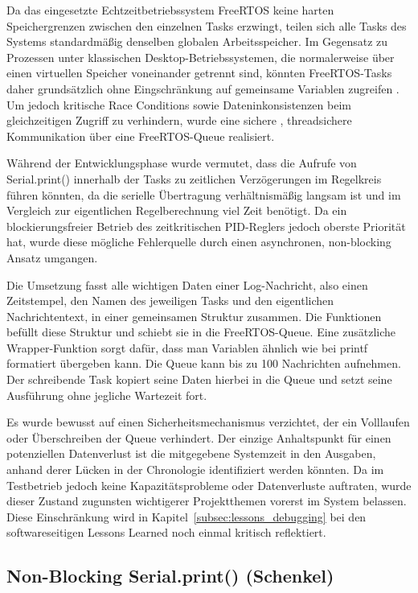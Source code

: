 \documentclass[fontsize=12pt,
parskip=half,	%
department=FakM,  %
logostyle=flat,
twoside, %
DIV=15,BCOR=10mm, %
]{OTHRreprt}
\begin{document}
Da das eingesetzte Echtzeitbetriebssystem FreeRTOS keine harten Speichergrenzen zwischen den einzelnen Tasks erzwingt, teilen sich alle Tasks des Systems standardmäßig denselben globalen Arbeitsspeicher. 
Im Gegensatz zu Prozessen unter klassischen Desktop-Betriebssystemen, die normalerweise über einen virtuellen Speicher voneinander getrennt sind, könnten FreeRTOS-Tasks daher grundsätzlich ohne Eingschränkung auf gemeinsame Variablen zugreifen \cite{freertos_ug}.
Um jedoch kritische Race Conditions sowie Dateninkonsistenzen beim gleichzeitigen Zugriff zu verhindern, wurde eine sichere , threadsichere Kommunikation über eine FreeRTOS-Queue realisiert.

Während der Entwicklungsphase wurde vermutet, dass die Aufrufe von Serial.print() innerhalb der Tasks zu zeitlichen Verzögerungen im Regelkreis führen könnten, da die serielle Übertragung verhältnismäßig langsam ist und im Vergleich zur eigentlichen Regelberechnung viel Zeit benötigt. 
Da ein blockierungsfreier Betrieb des zeitkritischen PID-Reglers jedoch oberste Priorität hat, wurde diese mögliche Fehlerquelle durch einen asynchronen, non-blocking Ansatz umgangen.

Die Umsetzung fasst alle wichtigen Daten einer Log-Nachricht, also einen Zeitstempel, den Namen des jeweiligen Tasks und den eigentlichen Nachrichtentext, in einer gemeinsamen Struktur zusammen. 
Die Funktionen befüllt diese Struktur und schiebt sie in die FreeRTOS-Queue. Eine zusätzliche Wrapper-Funktion sorgt dafür, dass man Variablen ähnlich wie bei printf formatiert übergeben kann. Die Queue kann bis zu 100 Nachrichten aufnehmen. Der schreibende Task kopiert seine Daten hierbei in die Queue und setzt seine Ausführung ohne jegliche Wartezeit fort.

Es wurde bewusst auf einen Sicherheitsmechanismus verzichtet, der ein Volllaufen oder Überschreiben der Queue verhindert. Der einzige Anhaltspunkt für einen potenziellen Datenverlust ist die mitgegebene Systemzeit in den Ausgaben, anhand derer Lücken in der Chronologie identifiziert werden könnten. Da im Testbetrieb jedoch keine Kapazitätsprobleme oder Datenverluste auftraten, wurde dieser Zustand zugunsten wichtigerer Projektthemen vorerst im System belassen. Diese Einschränkung wird in Kapitel~\ref{subsec:lessons_debugging} bei den soft\-ware\-sei\-ti\-gen Lessons Learned noch einmal kritisch reflektiert.


\subsection{Non-Blocking Serial.print() (Schenkel)}
\label{subsec:nonblocking_serial}
\end{document}
